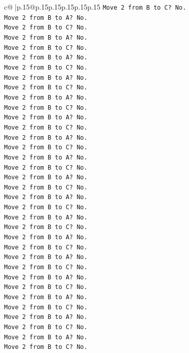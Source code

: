 \documentclass{article}
\begin{document}
{\begin{supertabular}{c@{$\;$}|p{.15\linewidth}@{}p{.15\linewidth}p{.15\linewidth}p{.15\linewidth}p{.15\linewidth}p{.15\linewidth}}
{{{\texttt{Move 2 from B to C? No.} \\
\texttt{Move 2 from B to A? No.} \\
\texttt{Move 2 from B to C? No.} \\
\texttt{Move 2 from B to A? No.} \\
\texttt{Move 2 from B to C? No.} \\
\texttt{Move 2 from B to A? No.} \\
\texttt{Move 2 from B to C? No.} \\
\texttt{Move 2 from B to A? No.} \\
\texttt{Move 2 from B to C? No.} \\
\texttt{Move 2 from B to A? No.} \\
\texttt{Move 2 from B to C? No.} \\
\texttt{Move 2 from B to A? No.} \\
\texttt{Move 2 from B to C? No.} \\
\texttt{Move 2 from B to A? No.} \\
\texttt{Move 2 from B to C? No.} \\
\texttt{Move 2 from B to A? No.} \\
\texttt{Move 2 from B to C? No.} \\
\texttt{Move 2 from B to A? No.} \\
\texttt{Move 2 from B to C? No.} \\
\texttt{Move 2 from B to A? No.} \\
\texttt{Move 2 from B to C? No.} \\
\texttt{Move 2 from B to A? No.} \\
\texttt{Move 2 from B to C? No.} \\
\texttt{Move 2 from B to A? No.} \\
\texttt{Move 2 from B to C? No.} \\
\texttt{Move 2 from B to A? No.} \\
\texttt{Move 2 from B to C? No.} \\
\texttt{Move 2 from B to A? No.} \\
\texttt{Move 2 from B to C? No.} \\
\texttt{Move 2 from B to A? No.} \\
\texttt{Move 2 from B to C? No.} \\
\texttt{Move 2 from B to A? No.} \\
\texttt{Move 2 from B to C? No.} \\
\texttt{Move 2 from B to A? No.} \\
\texttt{Move 2 from B to C? No.} \\
}}}
\end{supertabular}}
\end{document}
